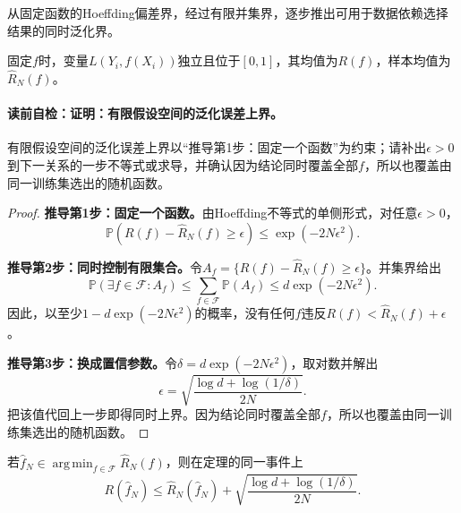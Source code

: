 \label{struct:V1-C10-CH13}

\begin{derivationgoalbox}
从固定函数的Hoeffding偏差界，经过有限并集界，逐步推出可用于数据依赖选择结果的同时泛化界。
\end{derivationgoalbox}
\begin{derivationprepbox}
固定$f$时，变量$L(Y_i,f(X_i))$独立且位于$[0,1]$，其均值为$R(f)$，样本均值为$\widehat R_N(f)$。
\end{derivationprepbox}
\paragraph{读前自检：证明：有限假设空间的泛化误差上界。}有限假设空间的泛化误差上界以“推导第1步：固定一个函数”为约束；请补出$\epsilon>0$到下一关系的一步不等式或求导，并确认因为结论同时覆盖全部$f$，所以也覆盖由同一训练集选出的随机函数。\par

\begin{proof}
\textbf{推导第1步：固定一个函数。}由Hoeffding不等式的单侧形式，对任意$\epsilon>0$，
\[
\mathbb P\!\left(R(f)-\widehat R_N(f)\ge\epsilon\right)
\le \exp(-2N\epsilon^2).
\]

\textbf{推导第2步：同时控制有限集合。}令$A_f=\{R(f)-\widehat R_N(f)\ge\epsilon\}$。并集界给出
\[
\mathbb P\!\left(\exists f\in\mathcal F:A_f\right)
\le\sum_{f\in\mathcal F}\mathbb P(A_f)
\le d\exp(-2N\epsilon^2).
\]
因此，以至少$1-d\exp(-2N\epsilon^2)$的概率，没有任何$f$违反$R(f)<\widehat R_N(f)+\epsilon$。

\textbf{推导第3步：换成置信参数。}令$\delta=d\exp(-2N\epsilon^2)$，取对数并解出
\[
\epsilon=\sqrt{\frac{\log d+\log(1/\delta)}{2N}}.
\]
把该值代回上一步即得同时上界。因为结论同时覆盖全部$f$，所以也覆盖由同一训练集选出的随机函数。
\end{proof}

\begin{corollary}[经验风险最小化解的上界]
若$\widehat f_N\in\operatorname*{arg\,min}_{f\in\mathcal F}\widehat R_N(f)$，则在定理的同一事件上
\[
R(\widehat f_N)\le\widehat R_N(\widehat f_N)
+\sqrt{\frac{\log d+\log(1/\delta)}{2N}}.
\]
\end{corollary}

